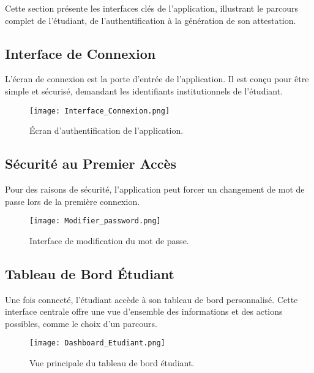 \documentclass[12pt,a4paper]{report}
\begin{document}
Cette section présente les interfaces clés de l'application, illustrant le parcours complet de l'étudiant, de l'authentification à la génération de son attestation.

\subsection{Interface de Connexion}
L'écran de connexion est la porte d'entrée de l'application. Il est conçu pour être simple et sécurisé, demandant les identifiants institutionnels de l'étudiant.
\begin{figure}[H]
    \centering
    \texttt{[image: Interface\_Connexion.png]}
    \caption{Écran d'authentification de l'application.}
    \label{fig:capture_connexion}
\end{figure}

\subsection{Sécurité au Premier Accès}
Pour des raisons de sécurité, l'application peut forcer un changement de mot de passe lors de la première connexion.
\begin{figure}[H]
    \centering
    \texttt{[image: Modifier\_password.png]}
    \caption{Interface de modification du mot de passe.}
    \label{fig:capture_password}
\end{figure}

\subsection{Tableau de Bord Étudiant}
Une fois connecté, l'étudiant accède à son tableau de bord personnalisé. Cette interface centrale offre une vue d'ensemble des informations et des actions possibles, comme le choix d'un parcours.
\begin{figure}[H]
    \centering
    \texttt{[image: Dashboard\_Etudiant.png]}
    \caption{Vue principale du tableau de bord étudiant.}
    \label{fig:capture_dashboard}
\end{figure}

\end{document}
